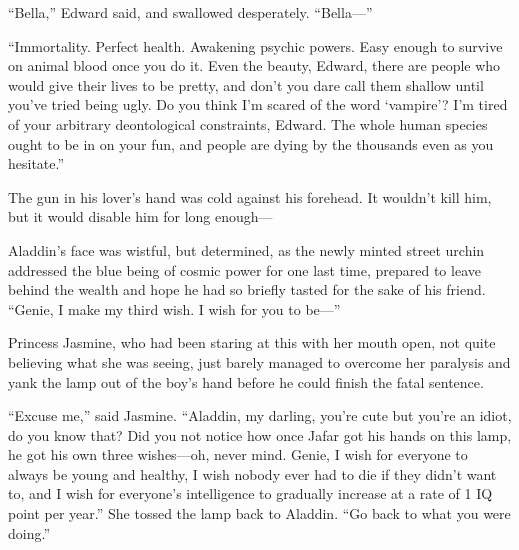 “Bella,” Edward said, and swallowed desperately. “Bella—”

“Immortality. Perfect health. Awakening psychic powers. Easy enough to survive on animal blood once you do it. Even the beauty, Edward, there are people who would give their lives to be pretty, and don’t you dare call them shallow until you’ve tried being ugly. Do you think I’m scared of the word ‘vampire’? I’m tired of your arbitrary deontological constraints, Edward. The whole human species ought to be in on your fun, and people are dying by the thousands even as you hesitate.”

The gun in his lover’s hand was cold against his forehead. It wouldn’t kill him, but it would disable him for long enough—

Aladdin’s face was wistful, but determined, as the newly minted street urchin addressed the blue being of cosmic power for one last time, prepared to leave behind the wealth and hope he had so briefly tasted for the sake of his friend. “Genie, I make my third wish. I wish for you to be—”

Princess Jasmine, who had been staring at this with her mouth open, not quite believing what she was seeing, just barely managed to overcome her paralysis and yank the lamp out of the boy’s hand before he could finish the fatal sentence.

“Excuse me,” said Jasmine. “Aladdin, my darling, you’re cute but you’re an idiot, do you know that? Did you not notice how once Jafar got his hands on this lamp, he got his own three wishes—oh, never mind. Genie, I wish for everyone to always be young and healthy, I wish nobody ever had to die if they didn’t want to, and I wish for everyone’s intelligence to gradually increase at a rate of 1 IQ point per year.” She tossed the lamp back to Aladdin. “Go back to what you were doing.”

